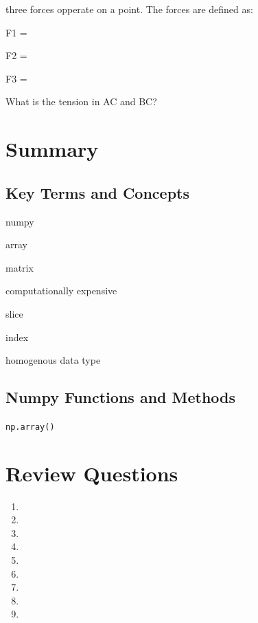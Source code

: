 \documentclass{book}
\begin{document}
three forces opperate on a point. The forces are defined as:

F1 =

F2 =

F3 =

What is the tension in AC and BC?
    




    
        \section{Summary}\label{summary}
    




    
        \subsection{Key Terms and Concepts}\label{key-terms-and-concepts}

numpy

array

matrix

computationally expensive

slice

index

homogenous data type
    




    
        \subsection{Numpy Functions and
Methods}\label{numpy-functions-and-methods}

\lstinline!np.array()!
    




    
        \section{Review Questions}\label{review-questions}
    




    
        \begin{enumerate}
\def\labelenumi{\arabic{enumi}.}
\item
\item
\item
\item
\item
\item
\item
\item
\item
\end{enumerate}
    
\end{document}

